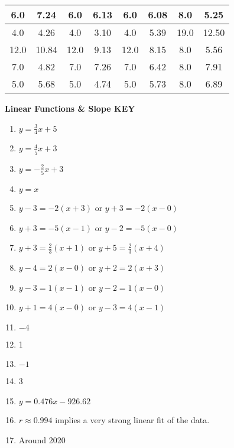 \documentclass[11pt]{article}
\begin{document}
\begin{tabular}{|c|c||c|c||c|c||c|c|}
6.0                            & 7.24                           & 6.0                            & 6.13                           & 6.0                            & 6.08                           & 8.0                            & 5.25                           \\    \hline
4.0                            & 4.26                           & 4.0                            & 3.10                           & 4.0                            & 5.39                           & 19.0                           & 12.50                          \\    \hline
12.0                           & 10.84                          & 12.0                           & 9.13                           & 12.0                           & 8.15                           & 8.0                            & 5.56                           \\    \hline
7.0                            & 4.82                           & 7.0                            & 7.26                           & 7.0                            & 6.42                           & 8.0                            & 7.91                           \\    \hline
5.0                            & 5.68                           & 5.0                            & 4.74                           & 5.0                            & 5.73                           & 8.0                            & 6.89                        \\   \hline  
\end{tabular}


\newpage



\textbf{Linear Functions \& Slope KEY}
\newline\\


\begin{enumerate}
    \item $y=\frac{3}{4}x+5$
    \item $y=\frac{4}{5}x+3$
    \item $y=-\frac{2}{5}x+3$
    \item $y=x$
    \item $y-3=-2(x+3)$ or $y+3=-2(x-0)$
    \item $y+3=-5(x-1)$ or $y-2=-5(x-0)$
    \item $y+3=\frac{2}{3}(x+1)$ or $y+5=\frac{2}{3}(x+4)$
    \item $y-4=2(x-0)$ or $y+2=2(x+3)$
    \item $y-3=1(x-1)$ or $y-2=1(x-0)$
    \item $y+1=4(x-0)$ or $y-3=4(x-1)$
    \item $-4$
    \item 1
    \item $-1$
    \item 3
    \item $y = 0.476x - 926.62$
    \item $r \approx 0.994$ implies a very strong linear fit of the data.
    \item Around 2020
\end{enumerate}
\end{document}
